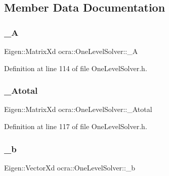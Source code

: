\subsection{Member Data Documentation}
\hypertarget{classocra_1_1OneLevelSolver_a95bb29fbd5260c74cc8d33078360b5fb}{}\label{classocra_1_1OneLevelSolver_a95bb29fbd5260c74cc8d33078360b5fb} 
\subsubsection{\texorpdfstring{\+\_\+A}{\_A}}
{\footnotesize\ttfamily Eigen\+::\+Matrix\+Xd ocra\+::\+One\+Level\+Solver\+::\+\_\+A\hspace{0.3cm}{\ttfamily [protected]}}



Definition at line 114 of file One\+Level\+Solver.\+h.

\hypertarget{classocra_1_1OneLevelSolver_aa9b4b11abdc9c91af248b1f9e2a6d592}{}\label{classocra_1_1OneLevelSolver_aa9b4b11abdc9c91af248b1f9e2a6d592} 
\subsubsection{\texorpdfstring{\+\_\+\+Atotal}{\_Atotal}}
{\footnotesize\ttfamily Eigen\+::\+Matrix\+Xd ocra\+::\+One\+Level\+Solver\+::\+\_\+\+Atotal\hspace{0.3cm}{\ttfamily [protected]}}



Definition at line 117 of file One\+Level\+Solver.\+h.

\hypertarget{classocra_1_1OneLevelSolver_a3c1c1c408757dad2c9f4256ceb7340d2}{}\label{classocra_1_1OneLevelSolver_a3c1c1c408757dad2c9f4256ceb7340d2} 
\subsubsection{\texorpdfstring{\+\_\+b}{\_b}}
{\footnotesize\ttfamily Eigen\+::\+Vector\+Xd ocra\+::\+One\+Level\+Solver\+::\+\_\+b\hspace{0.3cm}{\ttfamily [protected]}}



